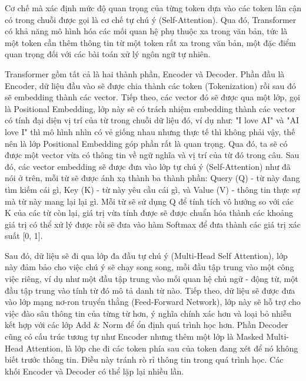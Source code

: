 \noindent
Cơ chế mà xác định mức độ quan trọng của từng token dựa vào các token lân cận có trong chuỗi được gọi là cơ chế tự chú ý (Self-Attention). Qua đó, Transformer có khả năng mô hình hóa các mối quan hệ phụ thuộc xa trong văn bản, tức là một token cần thêm thông tin từ một token rất xa trong văn bản, một đặc điểm quan trọng đối với các bài toán xử lý ngôn ngữ tự nhiên.

\vspace{\baselineskip}
\noindent
Transformer gồm tất cả là hai thành phần, Encoder và Decoder. Phần đầu là Encoder, dữ liệu đầu vào sẽ được chia thành các token (Tokenization) rồi sau đó sẽ embedding thành các vector. Tiếp theo, các vector đó sẽ được qua một lớp, gọi là Positional Embedding, lớp này sẽ có trách nhiệm embedding thành các vector có tính đại diện vị trí của từ trong chuỗi dữ liệu đó, ví dụ như: "I love AI" và "AI love I" thì mô hình nhìn có vẻ giống nhau nhưng thực tế
thì không phải vậy, thế nên là lớp Positional Embedding góp phần rất là quan trọng. Qua đó, ta sẽ có được một vector vừa có thông tin về ngữ nghĩa và vị trí của từ đó trong câu. Sau đó, các vector embedding sẽ được đưa vào lớp tự chú ý (Self-Attention) như đã nói ở trên, mỗi từ sẽ được ánh xạ thành ba thành phần: Query (Q) - từ này đang tìm kiếm cái gì, Key (K) - từ này yêu cầu cái gì, và Value (V) - thông tin thực sự mà từ này mang lại lại gì. Mỗi từ 
sẽ sử dụng Q để tính tích vô hướng so với các K của các từ còn lại, giá trị vừa tính được sẽ được chuẩn hóa thành các khoảng giá trị có thể xử lý được rồi sẽ đưa vào hàm Softmax để đưa thành các giá trị xác suất [0, 1].

\vspace{\baselineskip}
\noindent
Sau đó, dữ liệu sẽ đi qua lớp đa đầu tự chú ý (Multi-Head Self Attention), lớp này đảm bảo cho việc chú ý sẽ chạy song song, mỗi đầu tập trung vào một công việc riêng, ví dụ như một đầu tập trung vào mối quan hệ chủ ngữ - động từ, một đầu tập trung vào tính từ đó mô tả danh từ nào. Tiếp theo, dữ liệu sẽ được đưa vào lớp mạng nơ-ron truyển thằng (Feed-Forward Network), lớp này sẽ hỗ trợ cho việc đào sâu thông tin của từng từ hơn, ý nghĩa chính xác hơn và loại bỏ nhiễu kết hợp với các lớp
Add \& Norm để ổn định quá trình học hơn. Phần Decoder cũng có cấu trúc tương tự như Encoder nhưng thêm một lớp là Masked Multi-Head Attention, là lớp che đi các token phía sau của token đang xét để nó không biết trước thông tin. Điều này tránh rò rỉ thông tin trong quá trình học. Các khối Encoder và Decoder có thể lặp lại nhiều lần.

